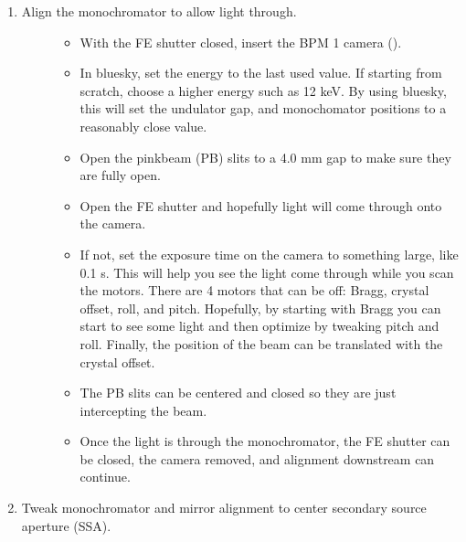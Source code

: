 \documentclass[letterpaper,10pt,english]{sphinxmanual}
\begin{document}
\begin{description}
\begin{enumerate}
\begin{description}
\begin{itemize}
\end{itemize}

\end{description}

\item {} \begin{description}
\item[{Align the monochromator to allow light through.}] \leavevmode\begin{itemize}
\item {} 
\sphinxAtStartPar
With the FE shutter closed, insert the BPM 1 camera ().

\item {} 
\sphinxAtStartPar
In bluesky, set the energy to the last used value. If starting from scratch, choose a higher energy such as 12 keV. By using bluesky, this will set the undulator gap, and monochomator positions to a reasonably close value.

\item {} 
\sphinxAtStartPar
Open the pink\sphinxhyphen{}beam (PB) slits to a 4.0 mm gap to make sure they are fully open.

\item {} 
\sphinxAtStartPar
Open the FE shutter and hopefully light will come through onto the camera.

\item {} 
\sphinxAtStartPar
If not, set the exposure time on the camera to something large, like 0.1 s. This will help you see the light come through while you scan the motors. There are 4 motors that can be off: Bragg, crystal offset, roll, and pitch. Hopefully, by starting with Bragg you can start to see some light and then optimize by tweaking pitch and roll. Finally, the position of the beam can be translated with the crystal offset.

\item {} 
\sphinxAtStartPar
The PB slits can be centered and closed so they are just intercepting the beam.

\item {} 
\sphinxAtStartPar
Once the light is through the monochromator, the FE shutter can be closed, the camera removed, and alignment downstream can continue.

\end{itemize}

\end{description}

\item {} 
\sphinxAtStartPar
Tweak monochromator and mirror alignment to center secondary source aperture (SSA).

\end{enumerate}

\end{description}
\end{document}
